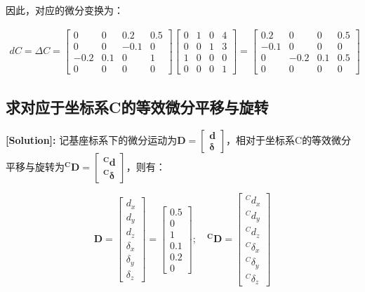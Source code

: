 \documentclass{ctexart}
\begin{document}
因此，对应的微分变换为：

\begin{equation}
	\begin{aligned}
		dC=\Delta C=\begin{bmatrix}
			0 & 0 & 0.2 & 0.5 \\
			0 & 0 & -0.1 & 0 \\
			-0.2 & 0.1 & 0 & 1 \\
			0 & 0 & 0 & 0
		\end{bmatrix}
		\begin{bmatrix}
			0 & 1 & 0 & 4\\
			0 & 0 & 1 & 3\\
			1 & 0 & 0 & 0\\
			0 & 0 & 0 & 1
		\end{bmatrix}
		=
		\begin{bmatrix}
			0.2 & 0 & 0 & 0.5\\
			-0.1 & 0 & 0 & 0\\
			0 & -0.2 & 0.1 & 0.5\\
			0 & 0 & 0 & 0
		\end{bmatrix}
	\end{aligned}
\end{equation}

\subsection{求对应于坐标系{C}的等效微分平移与旋转}
\textbf{[Solution]:}
记基座标系下的微分运动为$\mathbf{D} = \begin{bmatrix} \mathbf{d} \\ \mathbf{\delta} \end{bmatrix}$，相对于坐标系{C}的等效微分平移与旋转为$\mathbf{^CD} = \begin{bmatrix} \mathbf{^Cd} \\ \mathbf{^C\delta} \end{bmatrix}$，则有：

\begin{equation}
	\mathbf{D} = \begin{bmatrix} d_x \\ d_y \\ d_z \\ \delta_x \\ \delta_y \\ \delta_z \end{bmatrix} = \begin{bmatrix} 0.5 \\ 0 \\ 1 \\ 0.1 \\ 0.2 \\ 0 \end{bmatrix}; \quad \mathbf{^CD} = \begin{bmatrix} ^Cd_x \\ ^Cd_y \\ ^Cd_z \\ ^C\delta_x \\ ^C\delta_y \\ ^C\delta_z \end{bmatrix}
\end{equation}
\end{document}
